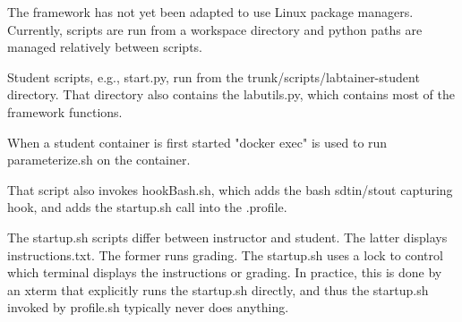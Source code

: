 The framework has not yet been adapted to use Linux package managers.
Currently, scripts are run from a workspace directory and python
paths are managed relatively between scripts.  

Student scripts, e.g., start.py, run from the trunk/scripts/labtainer-student directory.
That directory also contains the labutils.py, which contains most of the framework
functions.


When a student container is first started "docker exec" is used
to run parameterize.sh on the container.

That script also invokes hookBash.sh, which adds the bash
sdtin/stout capturing hook, and adds the startup.sh call
into the .profile.

The startup.sh scripts differ between instructor and student.  The latter
displays instructions.txt.  The former runs grading.
The startup.sh uses a lock to control which
terminal displays the instructions or grading.  In practice, this is done by
an xterm that explicitly runs the startup.sh directly, and thus
the startup.sh invoked by profile.sh typically never does anything.


